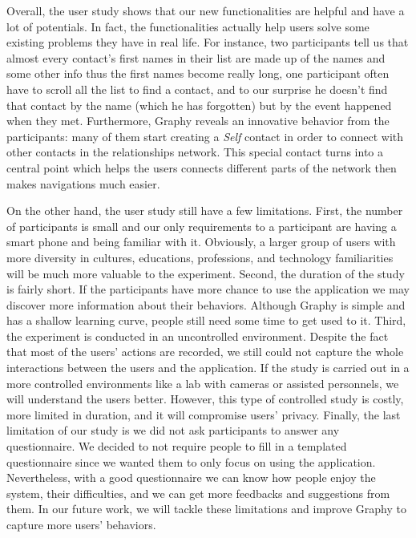 Overall, the user study shows that our new functionalities are helpful and have a lot of potentials. In fact, the functionalities actually help users solve some existing problems they have in real life. For instance, two participants tell us that almost every contact's first names in their list are made up of the names and some other info thus the first names become really long, one participant often have to scroll all the list to find a contact, and to our surprise he doesn't find that contact by the name (which he has forgotten) but by the event happened when they met. Furthermore, Graphy reveals an innovative behavior from the participants: many of them start creating a \textit{Self} contact in order to connect with other contacts in the relationships network. This special contact turns into a central point which helps the users connects different parts of the network then makes navigations much easier.

On the other hand, the user study still have a few limitations. First, the number of participants is small and our only requirements to a participant are having a smart phone and being familiar with it. Obviously, a larger group of users with more diversity in cultures, educations, professions, and technology familiarities will be much more valuable to the experiment. Second, the duration of the study is fairly short. If the participants have more chance to use the application we may discover more information about their behaviors. Although Graphy is simple and has a shallow learning curve, people still need some time to get used to it. Third, the experiment is conducted in an uncontrolled environment. Despite the fact that most of the users' actions are recorded, we still could not capture the whole interactions between the users and the application. If the study is carried out in a more controlled environments like a lab with cameras or assisted personnels, we will understand the users better. However, this type of controlled study is costly, more limited in duration, and it will compromise users' privacy. Finally, the last limitation of our study is we did not ask participants to answer any questionnaire. We decided to not require people to fill in a templated questionnaire since we wanted them to only focus on using the application. Nevertheless, with a good questionnaire we can know how people enjoy the system, their difficulties, and we can get more feedbacks and suggestions from them. In our future work, we will tackle these limitations and improve Graphy to capture more users' behaviors.

